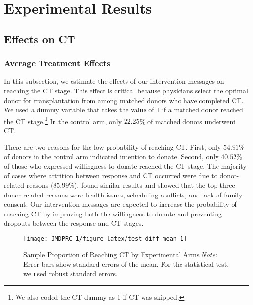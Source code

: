 \documentclass[12pt, a4paper]{article}
\begin{document}
\hypertarget{result}{%
\section{Experimental Results}\label{result}}

\hypertarget{main}{%
\subsection{Effects on CT}\label{main}}

\hypertarget{average-treatment-effects}{%
\subsubsection{Average Treatment Effects}\label{average-treatment-effects}}

In this subsection, we estimate the effects of our intervention messages on reaching the CT stage. This effect is critical because physicians select the optimal donor for transplantation from among matched donors who have completed CT. We used a dummy variable that takes the value of 1 if a matched donor reached the CT stage.\footnote{We also coded the CT dummy as 1 if CT was skipped.} In the control arm, only \(22.25\)\% of matched donors underwent CT.

There are two reasons for the low probability of reaching CT. First, only \(54.91\)\% of donors in the control arm indicated intention to donate. Second, only \(40.52\)\% of those who expressed willingness to donate reached the CT stage. The majority of cases where attrition between response and CT occurred were due to donor-related reasons (\(85.99\)\%). \citet{Hirakawa2018} found similar results and showed that the top three donor-related reasons were health issues, scheduling conflicts, and lack of family consent. Our intervention messages are expected to increase the probability of reaching CT by improving both the willingness to donate and preventing dropouts between the response and CT stages.

\begin{figure}[t]
\texttt{[image: JMDPRC~1/figure-latex/test-diff-mean-1]} \caption{Sample Proportion of Reaching CT by Experimental Arms.\newline \emph{Note}: Error bars show standard errors of the mean. For the statistical test, we used robust standard errors.}\label{fig:test-diff-mean}
\end{figure}
\end{document}
